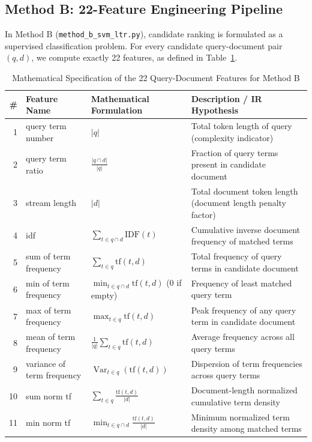 \documentclass[11pt,a4paper]{article}
\DeclareMathOperator{\Var}{Var}
\begin{document}
\subsection{Method B: 22-Feature Engineering Pipeline}
In Method B (\texttt{method\_b\_svm\_ltr.py}), candidate ranking is formulated as a supervised classification problem. For every candidate query-document pair $(q, d)$, we compute exactly 22 features, as defined in Table~\ref{tab:features_spec}.

\begin{table}[H]
\centering
\caption{Mathematical Specification of the 22 Query-Document Features for Method B}
\label{tab:features_spec}
\footnotesize
\renewcommand{\arraystretch}{1.15}
\begin{tabularx}{\textwidth}{rllX}
\toprule
\textbf{\#} & \textbf{Feature Name} & \textbf{Mathematical Formulation} & \textbf{Description / IR Hypothesis} \\
\midrule
1 & query term number & $|q|$ & Total token length of query (complexity indicator) \\
2 & query term ratio & $\frac{|q \cap d|}{|q|}$ & Fraction of query terms present in candidate document \\
3 & stream length & $|d|$ & Total document token length (document length penalty factor) \\
4 & idf & $\sum_{t \in q \cap d} \text{IDF}(t)$ & Cumulative inverse document frequency of matched terms \\
5 & sum of term frequency & $\sum_{t \in q} \text{tf}(t, d)$ & Total frequency of query terms in candidate document \\
6 & min of term frequency & $\min_{t \in q \cap d} \text{tf}(t, d)$ (0 if empty) & Frequency of least matched query term \\
7 & max of term frequency & $\max_{t \in q} \text{tf}(t, d)$ & Peak frequency of any query term in candidate document \\
8 & mean of term frequency & $\frac{1}{|q|} \sum_{t \in q} \text{tf}(t, d)$ & Average frequency across all query terms \\
9 & variance of term frequency & $\Var_{t \in q}(\text{tf}(t, d))$ & Dispersion of term frequencies across query terms \\
10 & sum norm tf & $\sum_{t \in q} \frac{\text{tf}(t, d)}{|d|}$ & Document-length normalized cumulative term density \\
11 & min norm tf & $\min_{t \in q \cap d} \frac{\text{tf}(t, d)}{|d|}$ & Minimum normalized term density among matched terms \\

\end{tabularx}
\end{table}
\end{document}
